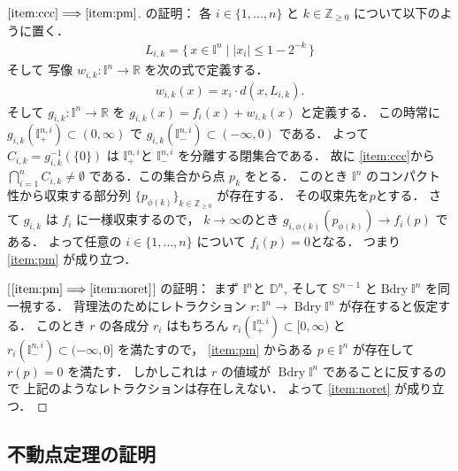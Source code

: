 \documentclass[leqno, a4paper, 12pt]{jsarticle}
\theoremstyle{plain}
\theoremstyle{definition}
\theoremstyle{remark}
\newcommand{\To}{\Longrightarrow}
\newcommand{\zz}{\mathbb{Z}}
\newcommand{\rr}{\mathbb{R}}
\DeclareMathOperator{\bd}{\mathrm{Bdry}}
\newcommand{\yospfont}[1]{\mathbb{#1}}
\newcommand{\yodisc}[1]{\yospfont{D}^{#1}}
\newcommand{\yosphere}[1]{\yospfont{S}^{#1}}
\newcommand{\yocube}[1]{\yospfont{I}^{#1}}
\newcommand{\yocubesidep}[2]{\yospfont{I}^{#1, #2}_{+}}
\newcommand{\yocubesidem}[2]{\yospfont{I}^{#1, #2}_{-}}
\newcommand{\yocubebd}[1]{\bd\yospfont{I}^{#1}}
\numberwithin{equation}{section}
\begin{document}
\begin{proof}
[$\ref{item:ccc}\To \ref{item:pm}$]
の証明：
各
$i\in \{1, \dots, n\}$
と
$k\in\zz_{\ge 0}$
について以下のように置く．
\begin{align}
L_{i, k}=\{\, x\in \yocube{n}\mid |x_{i}|\le 1-2^{-k}\, \}
\end{align}
そして
写像
$w_{i, k}\colon\yocube{n}\to \rr$
を次の式で定義する．
\begin{align}
w_{i, k}(x)=
x_{i}\cdot d(x, L_{i, k}). 
\end{align}
そして
$g_{i, k}\colon \yocube{n}\to \rr$
を
$g_{i, k}(x)=f_{i}(x)+w_{i, k}(x)$
と定義する．
この時常に
$g_{i, k}(\yocubesidep{n}{i})\subset (0, \infty)$
で
$g_{i, k}(\yocubesidem{n}{i})\subset (-\infty, 0)$
である．
よって
$C_{i, k}=g_{i, k}^{-1}(\{0\})$
は
$\yocubesidep{n}{i}$と
$\yocubesidem{n}{i}$
を分離する閉集合である．
故に
\ref{item:ccc}から
$\bigcap_{i=1}^{n}C_{i, k}\neq \emptyset$
である．この集合から点
$p_{k}$
をとる．
このとき
$\yocube{n}$
のコンパクト性から収束する部分列
$\{p_{\phi(k)}\}_{k\in \zz_{\ge 0}}$
が存在する．
その収束先を$p$とする．
さて
$g_{i, k}$
は
$f_{i}$
に一様収束するので，
$k\to \infty$のとき
$g_{i, \phi(k)}(p_{\phi(k)})\to f_{i}(p)$
である．
よって任意の
$i\in \{1, \dots, n\}$
について
$f_{i}(p)=0$となる．
つまり
\ref{item:pm}
が成り立つ．


[$\ref{item:pm}\To \ref{item:noret}$]
の証明：
まず
$\yocube{n}$と
$\yodisc{n}$, 
そして
$\yosphere{n-1}$
と$\yocubebd{n}$
を同一視する．
背理法のためにレトラクション
$r\colon \yocube{n}\to \yocubebd{n}$
が存在すると仮定する．
このとき
$r$
の各成分
$r_{i}$
はもちろん
$r_{i}(\yocubesidep{n}{i})\subset [0, \infty)$
と
$r_{i}(\yocubesidem{n}{i})\subset (-\infty, 0]$
を満たすので，
\ref{item:pm}
からある
$p\in \yocube{n}$
が存在して
$r(p)=0$
を満たす．
しかしこれは
$r$
の値域が
$\yocubebd{n}$
であることに反するので
上記のようなレトラクションは存在しえない．
よって
\ref{item:noret}
が成り立つ．
\end{proof}


\subsection{不動点定理の証明}\label{subsec:proofoffxptthm}
\end{document}
